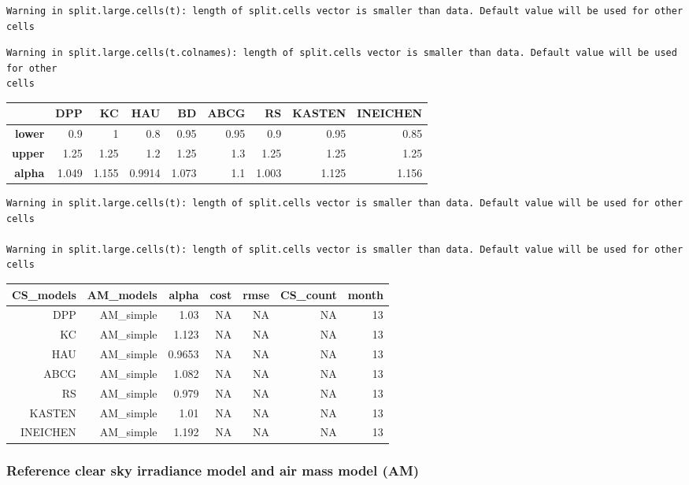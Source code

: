 \documentclass[
  10pt,
  a4paper,oneside]{article}
\begin{document}
\begin{verbatim}
Warning in split.large.cells(t): length of split.cells vector is smaller than data. Default value will be used for other cells
\end{verbatim}

\begin{verbatim}
Warning in split.large.cells(t.colnames): length of split.cells vector is smaller than data. Default value will be used for other
cells
\end{verbatim}

\begin{longtable}[]{@{}rrrrrrrrr@{}}
\toprule
~ & DPP & KC & HAU & BD & ABCG & RS & KASTEN & INEICHEN\tabularnewline
\midrule
\endhead
\textbf{lower} & 0.9 & 1 & 0.8 & 0.95 & 0.95 & 0.9 & 0.95 & 0.85\tabularnewline
\textbf{upper} & 1.25 & 1.25 & 1.2 & 1.25 & 1.3 & 1.25 & 1.25 & 1.25\tabularnewline
\textbf{alpha} & 1.049 & 1.155 & 0.9914 & 1.073 & 1.1 & 1.003 & 1.125 & 1.156\tabularnewline
\bottomrule
\end{longtable}

\begin{verbatim}
Warning in split.large.cells(t): length of split.cells vector is smaller than data. Default value will be used for other cells

Warning in split.large.cells(t): length of split.cells vector is smaller than data. Default value will be used for other cells
\end{verbatim}

\begin{longtable}[]{@{}rrrrrrr@{}}
\toprule
CS\_models & AM\_models & alpha & cost & rmse & CS\_count & month\tabularnewline
\midrule
\endhead
DPP & AM\_simple & 1.03 & NA & NA & NA & 13\tabularnewline
KC & AM\_simple & 1.123 & NA & NA & NA & 13\tabularnewline
HAU & AM\_simple & 0.9653 & NA & NA & NA & 13\tabularnewline
ABCG & AM\_simple & 1.082 & NA & NA & NA & 13\tabularnewline
RS & AM\_simple & 0.979 & NA & NA & NA & 13\tabularnewline
KASTEN & AM\_simple & 1.01 & NA & NA & NA & 13\tabularnewline
INEICHEN & AM\_simple & 1.192 & NA & NA & NA & 13\tabularnewline
\bottomrule
\end{longtable}

\hypertarget{reference-clear-sky-irradiance-model-and-air-mass-model-am}{%
\subsubsection{Reference clear sky irradiance model and air mass model (AM)}\label{reference-clear-sky-irradiance-model-and-air-mass-model-am}}
\end{document}
